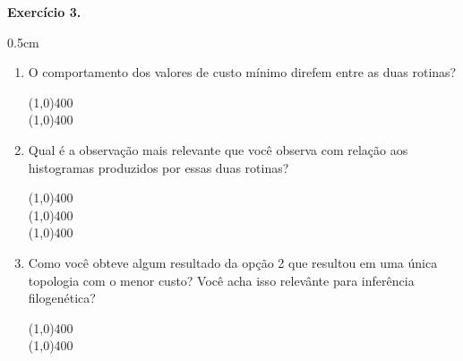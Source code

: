 \begin{refsection}
\begin{blackBlock}{\textbf{Exercício 3.}}
\begin {myindentpar}{0.5cm}
\begin{enumerate}[\itshape i.]
 \item{O comportamento dos valores de custo mínimo direfem entre as duas rotinas?}\\
  \begin{center}
  \line(1,0){400}\\
  \line(1,0){400}\\
  \end{center}

 \item{Qual é a observação mais relevante que você observa com relação aos histogramas produzidos por essas duas rotinas?}\\
  \begin{center}
  \line(1,0){400}\\
  \line(1,0){400}\\
  \line(1,0){400}\\
  \end{center}

 \item{Como você obteve algum resultado da opção 2 que resultou em uma única topologia com o menor custo? Você acha isso relevânte para inferência filogenética?}\\
  \begin{center}
  \line(1,0){400}\\
  \line(1,0){400}\\
  \end{center}

\end{enumerate}
\end{myindentpar}

\end{blackBlock}



\vspace{20pt}


\end{refsection}
